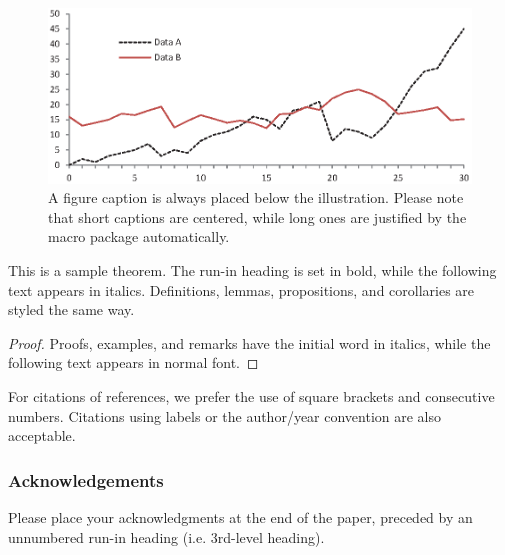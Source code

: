 \documentclass[runningheads]{llncs}
\begin{document}
\begin{figure}
\includegraphics[width=\textwidth]{fig1.eps}
\caption{A figure caption is always placed below the illustration.
Please note that short captions are centered, while long ones are
justified by the macro package automatically.} \label{fig1}
\end{figure}

\begin{theorem}
This is a sample theorem. The run-in heading is set in bold, while
the following text appears in italics. Definitions, lemmas,
propositions, and corollaries are styled the same way.
\end{theorem}
%
%
\begin{proof}
Proofs, examples, and remarks have the initial word in italics,
while the following text appears in normal font.
\end{proof}
For citations of references, we prefer the use of square brackets
and consecutive numbers. Citations using labels or the author/year
convention are also acceptable. 

\cite{DeDomenico2013,Kivela2014,Bianconi2018}

\subsubsection{Acknowledgements} Please place your acknowledgments at
the end of the paper, preceded by an unnumbered run-in heading (i.e.
3rd-level heading).

%
%
%


\end{document}
